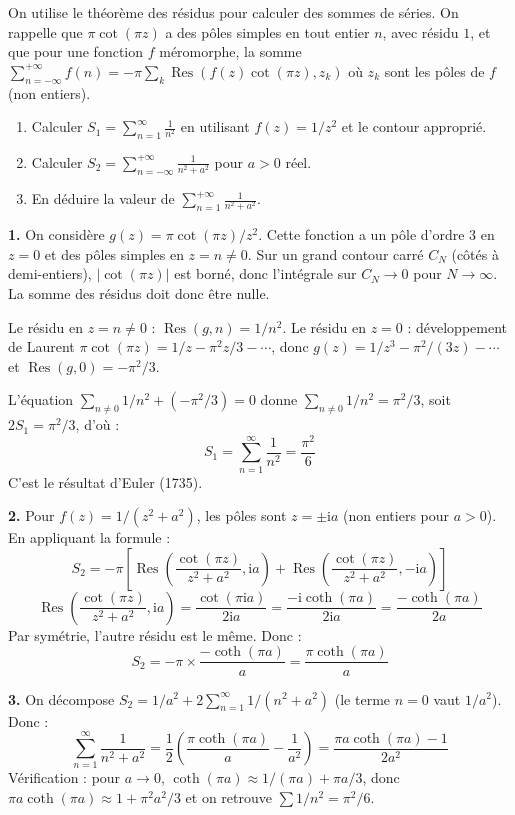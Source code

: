 \documentclass[12pt,a4paper]{article}
\begin{document}
\begin{boiteexercice}
On utilise le théorème des résidus pour calculer des sommes de séries. On rappelle que $\pi\cot(\pi z)$ a des pôles simples en tout entier $n$, avec résidu $1$, et que pour une fonction $f$ méromorphe, la somme $\sum_{n=-\infty}^{+\infty} f(n) = -\pi\sum_k \operatorname{Res}(f(z)\cot(\pi z), z_k)$ où $z_k$ sont les pôles de $f$ (non entiers).
\begin{enumerate}
  \item Calculer $\displaystyle S_1 = \sum_{n=1}^\infty \frac{1}{n^2}$ en utilisant $f(z)=1/z^2$ et le contour approprié.
  \item Calculer $\displaystyle S_2 = \sum_{n=-\infty}^{+\infty}\frac{1}{n^2+a^2}$ pour $a>0$ réel.
  \item En déduire la valeur de $\displaystyle \sum_{n=1}^{+\infty}\frac{1}{n^2+a^2}$.
\end{enumerate}
\end{boiteexercice}

\begin{boitecorrige}
\textbf{1.} On considère $g(z) = \pi\cot(\pi z)/z^2$. Cette fonction a un pôle d'ordre 3 en $z=0$ et des pôles simples en $z=n\neq0$. Sur un grand contour carré $C_N$ (côtés à demi-entiers), $|\cot(\pi z)|$ est borné, donc l'intégrale sur $C_N\to0$ pour $N\to\infty$. La somme des résidus doit donc être nulle.

Le résidu en $z=n\neq0$ : $\operatorname{Res}(g,n)=1/n^2$.
Le résidu en $z=0$ : développement de Laurent $\pi\cot(\pi z)=1/z - \pi^2z/3 - \cdots$, donc $g(z)=1/z^3 - \pi^2/(3z) - \cdots$ et $\operatorname{Res}(g,0) = -\pi^2/3$.

L'équation $\sum_{n\neq0}1/n^2 + (-\pi^2/3) = 0$ donne $\sum_{n\neq0}1/n^2 = \pi^2/3$, soit $2S_1 = \pi^2/3$, d'où :
\[
\boxed{S_1 = \sum_{n=1}^\infty\frac{1}{n^2} = \frac{\pi^2}{6}}
\]
C'est le résultat d'Euler (1735).

\textbf{2.} Pour $f(z)=1/(z^2+a^2)$, les pôles sont $z=\pm\mathrm{i}a$ (non entiers pour $a>0$). En appliquant la formule :
\[
S_2 = -\pi\left[\operatorname{Res}\!\left(\frac{\cot(\pi z)}{z^2+a^2},\mathrm{i}a\right)+\operatorname{Res}\!\left(\frac{\cot(\pi z)}{z^2+a^2},-\mathrm{i}a\right)\right]
\]
\[
\operatorname{Res}\!\left(\frac{\cot(\pi z)}{z^2+a^2},\mathrm{i}a\right) = \frac{\cot(\pi\mathrm{i}a)}{2\mathrm{i}a} = \frac{-\mathrm{i}\coth(\pi a)}{2\mathrm{i}a} = \frac{-\coth(\pi a)}{2a}
\]
Par symétrie, l'autre résidu est le même. Donc :
\[
S_2 = -\pi\times\frac{-\coth(\pi a)}{a} = \boxed{\frac{\pi\coth(\pi a)}{a}}
\]

\textbf{3.} On décompose $S_2 = 1/a^2 + 2\sum_{n=1}^\infty 1/(n^2+a^2)$ (le terme $n=0$ vaut $1/a^2$). Donc :
\[
\sum_{n=1}^\infty\frac{1}{n^2+a^2} = \frac{1}{2}\left(\frac{\pi\coth(\pi a)}{a} - \frac{1}{a^2}\right) = \frac{\pi a\coth(\pi a)-1}{2a^2}
\]
Vérification : pour $a\to0$, $\coth(\pi a)\approx 1/(\pi a)+\pi a/3$, donc $\pi a\coth(\pi a)\approx 1+\pi^2a^2/3$ et on retrouve $\sum 1/n^2=\pi^2/6$.
\end{boitecorrige}
\end{document}
